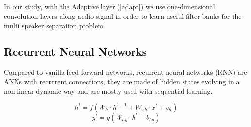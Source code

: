 \documentclass[master, tikz, final,11pt, dvipdfmx]{iscs-thesis}
\begin{document}
In our study, with the Adaptive layer (\autoref{adapt}) we use one-dimensional convolution layers along audio signal in order to learn useful filter-banks for the multi speaker separation problem.

\subsection{Recurrent Neural Networks}

Compared to vanilla feed forward networks, recurrent neural networks (RNN) are ANNs with recurrent connections, they are made of hidden states evolving in a non-linear dynamic way and
are mostly used with sequential learning.

\[
h^{t} = f(W_h \cdot h^{t-1} + W_{xh} \cdot x^t + b_h)
\]
\[
y^t = g(W_{hy} \cdot h^t + b_{hy} )
\]
\end{document}
